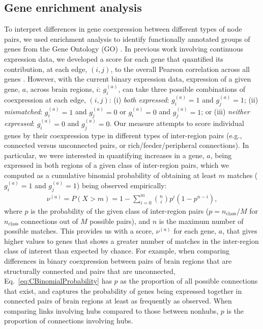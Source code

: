 \documentclass[10pt,letterpaper]{article}
\begin{document}
\subsection*{Gene enrichment analysis}
To interpret differences in gene coexpression between different types of node pairs, we used enrichment analysis to identify functionally annotated groups of genes from the Gene Ontology (GO) \cite{Ashburner2000}.
In previous work involving continuous expression data, we developed a score for each gene that quantified its contribution, at each edge, $(i,j)$, to the overall Pearson correlation across all genes \cite{Fulcher:2016ck}.
However, with the current binary expression data, expression of a given gene, $a$, across brain regions, $i$: $g^{(a)}_i$, can take three possible combinations of coexpression at each edge, $(i,j)$:
(i) \emph{both expressed}: $g^{(a)}_i = 1$ and $g^{(a)}_j = 1$;
(ii) \emph{mismatched}: $g^{(a)}_i = 1$ and $g^{(a)}_j = 0$ or $g^{(a)}_i = 0$ and $g^{(a)}_j = 1$; or
(iii) \emph{neither expressed}: $g^{(a)}_i = 0$ and $g^{(a)}_j = 0$.
Our measure attempts to score individual genes by their coexpression type in different types of inter-region pairs (e.g., connected versus unconnected pairs, or rich/feeder/peripheral connections).
In particular, we were interested in quantifying increases in a gene, $a$, being expressed in both regions of a given class of inter-region pairs, which we computed as a cumulative binomial probability of obtaining at least $m$ matches ($g^{(a)}_i = 1$ and $g^{(a)}_j = 1$) being observed empirically:
\begin{eqnarray}
	\label{eq:CBinomialProbability}
     \nu^{(a)} = P(X > m) = 1 - \sum_{i=0}^{m}\binom{n}{i} p^{i}(1-p^{n-i}),
\end{eqnarray}
where $p$ is the probability of the given class of inter-region pairs ($p = n_\mathrm{class}/M$ for $n_\mathrm{class}$ connections out of $M$ possible pairs), and $n$ is the maximum number of possible matches.
This provides us with a score, $\nu^{(a)}$ for each gene, $a$, that gives higher values to genes that shows a greater number of matches in the inter-region class of interest than expected by chance.
For example, when comparing differences in binary coexpression between pairs of brain regions that are structurally connected and pairs that are unconnected, Eq.~\eqref{eq:CBinomialProbability} has $p$ as the proportion of all possible connections that exist, and captures the probability of genes being expressed together in connected pairs of brain regions at least as frequently as observed.
When comparing links involving hubs compared to those between nonhubs, $p$ is the proportion of connections involving hubs.
\end{document}
